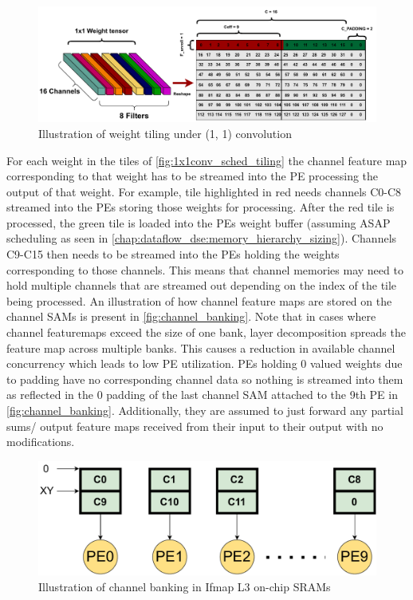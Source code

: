 \begin{figure}[ht]
    \centering
    \includegraphics[scale=0.6]{fig/1x1conv_sched_tiling.pdf}
    \caption{Illustration of weight tiling under (1, 1) convolution}
    \label{fig:1x1conv_sched_tiling}
\end{figure}

For each weight in the tiles of \autoref{fig:1x1conv_sched_tiling} the channel
feature map corresponding to that weight has to be streamed into the PE
processing the output of that weight. For example, tile highlighted in red needs
channels C0-C8 streamed into the PEs storing those weights for processing. After
the red tile is processed, the green tile is loaded into the PEs weight buffer
(assuming ASAP scheduling as seen in
\autoref{chap:dataflow_dse:memory_hierarchy_sizing}). Channels C9-C15 then needs to be
streamed into the PEs holding the weights corresponding to those channels. This
means that channel memories may need to hold multiple channels that are streamed
out depending on the index of the tile being processed. An illustration of how
channel feature maps are stored on the channel SAMs is present in
\autoref{fig:channel_banking}. Note that in cases where channel featuremaps
exceed the size of one bank, layer decomposition spreads the feature map across
multiple banks. This causes a reduction in available channel concurrency which
leads to low PE utilization. PEs holding 0 valued weights due to padding have no
corresponding channel data so nothing is streamed into them as reflected in the
0 padding of the last channel SAM attached to the 9th PE in
\autoref{fig:channel_banking}. Additionally, they are assumed to just forward
any partial sums/ output feature maps received from their input to their output
with no modifications.

\begin{figure}[ht]
    \centering
    \includegraphics[scale=0.495]{fig/1x1conv_ifmap_banking.pdf}
    \caption{Illustration of channel banking in Ifmap L3 on-chip SRAMs}
    \label{fig:channel_banking}
\end{figure}

